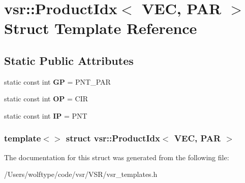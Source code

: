 \hypertarget{structvsr_1_1_product_idx_3_01_v_e_c_00_01_p_a_r_01_4}{\section{vsr\-:\-:Product\-Idx$<$ V\-E\-C, P\-A\-R $>$ Struct Template Reference}
\label{structvsr_1_1_product_idx_3_01_v_e_c_00_01_p_a_r_01_4}
}
\subsection*{Static Public Attributes}
\begin{DoxyCompactItemize}
\item 
\hypertarget{structvsr_1_1_product_idx_3_01_v_e_c_00_01_p_a_r_01_4_ac5cd94d8db7f827df2f6da511fef698b}{static const int {\bfseries G\-P} = P\-N\-T\-\_\-\-P\-A\-R}\label{structvsr_1_1_product_idx_3_01_v_e_c_00_01_p_a_r_01_4_ac5cd94d8db7f827df2f6da511fef698b}

\item 
\hypertarget{structvsr_1_1_product_idx_3_01_v_e_c_00_01_p_a_r_01_4_a98016cd2f27f9547eddbc62b83b6c451}{static const int {\bfseries O\-P} = C\-I\-R}\label{structvsr_1_1_product_idx_3_01_v_e_c_00_01_p_a_r_01_4_a98016cd2f27f9547eddbc62b83b6c451}

\item 
\hypertarget{structvsr_1_1_product_idx_3_01_v_e_c_00_01_p_a_r_01_4_ab376222b69b1d9232217722ab19a8bfd}{static const int {\bfseries I\-P} = P\-N\-T}\label{structvsr_1_1_product_idx_3_01_v_e_c_00_01_p_a_r_01_4_ab376222b69b1d9232217722ab19a8bfd}

\end{DoxyCompactItemize}
\subsubsection*{template$<$$>$ struct vsr\-::\-Product\-Idx$<$ V\-E\-C, P\-A\-R $>$}



The documentation for this struct was generated from the following file\-:\begin{DoxyCompactItemize}
\item 
/\-Users/wolftype/code/vsr/\-V\-S\-R/vsr\-\_\-templates.\-h\end{DoxyCompactItemize}
